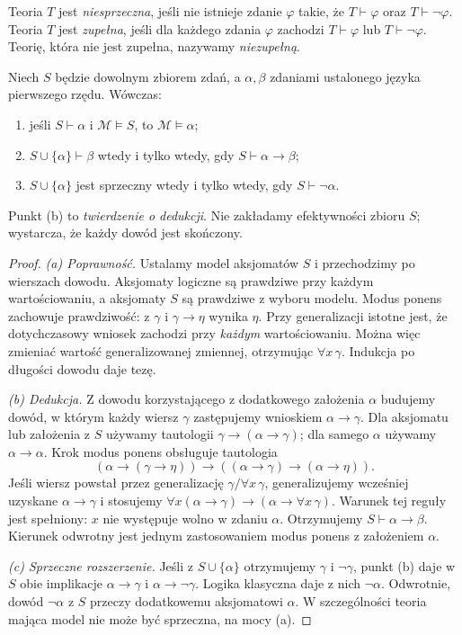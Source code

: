 \begin{definicja}\label{res:3:5}
Teoria $T$ jest \emph{niesprzeczna}, jeśli nie istnieje zdanie $\varphi$ takie, że $T\vdash\varphi$ oraz $T\vdash\neg\varphi$. Teoria $T$ jest \emph{zupełna}, jeśli dla każdego zdania $\varphi$ zachodzi $T\vdash\varphi$ lub $T\vdash\neg\varphi$. Teorię, która nie jest zupełna, nazywamy \emph{niezupełną}.
\end{definicja}

\begin{lemat}\label{res:3:6}
Niech $S$ będzie dowolnym zbiorem zdań, a $\alpha,\beta$ zdaniami ustalonego języka pierwszego rzędu. Wówczas:
\begin{enumerate}[label=(\alph*)]
\item jeśli $S\vdash\alpha$ i $\mathcal M\models S$, to $\mathcal M\models\alpha$;
\item $S\cup\{\alpha\}\vdash\beta$ wtedy i tylko wtedy, gdy $S\vdash\alpha\to\beta$;
\item $S\cup\{\alpha\}$ jest sprzeczny wtedy i tylko wtedy, gdy $S\vdash\neg\alpha$.
\end{enumerate}
Punkt (b) to \emph{twierdzenie o dedukcji}. Nie zakładamy efektywności zbioru $S$; wystarcza, że każdy dowód jest skończony.
\end{lemat}

\begin{proof}
\emph{(a) Poprawność.} Ustalamy model aksjomatów $S$ i przechodzimy po wierszach dowodu. Aksjomaty logiczne są prawdziwe przy każdym wartościowaniu, a aksjomaty $S$ są prawdziwe z wyboru modelu. Modus ponens zachowuje prawdziwość: z $\gamma$ i $\gamma\to\eta$ wynika $\eta$. Przy generalizacji istotne jest, że dotychczasowy wniosek zachodzi przy \emph{każdym} wartościowaniu. Można więc zmieniać wartość generalizowanej zmiennej, otrzymując $\forall x\,\gamma$. Indukcja po długości dowodu daje tezę.

\emph{(b) Dedukcja.} Z dowodu korzystającego z dodatkowego założenia $\alpha$ budujemy dowód, w którym każdy wiersz $\gamma$ zastępujemy wnioskiem $\alpha\to\gamma$. Dla aksjomatu lub założenia z $S$ używamy tautologii $\gamma\to(\alpha\to\gamma)$; dla samego $\alpha$ używamy $\alpha\to\alpha$. Krok modus ponens obsługuje tautologia
\[
(\alpha\to(\gamma\to\eta))\to((\alpha\to\gamma)\to(\alpha\to\eta)).
\]
Jeśli wiersz powstał przez generalizację $\gamma/\forall x\,\gamma$, generalizujemy wcześniej uzyskane $\alpha\to\gamma$ i stosujemy $\forall x(\alpha\to\gamma)\to(\alpha\to\forall x\,\gamma)$. Warunek tej reguły jest spełniony: $x$ nie występuje wolno w zdaniu $\alpha$. Otrzymujemy $S\vdash\alpha\to\beta$. Kierunek odwrotny jest jednym zastosowaniem modus ponens z założeniem $\alpha$.

\emph{(c) Sprzeczne rozszerzenie.} Jeśli z $S\cup\{\alpha\}$ otrzymujemy $\gamma$ i $\neg\gamma$, punkt (b) daje w $S$ obie implikacje $\alpha\to\gamma$ i $\alpha\to\neg\gamma$. Logika klasyczna daje z nich $\neg\alpha$. Odwrotnie, dowód $\neg\alpha$ z $S$ przeczy dodatkowemu aksjomatowi $\alpha$. W szczególności teoria mająca model nie może być sprzeczna, na mocy (a).
\end{proof}


